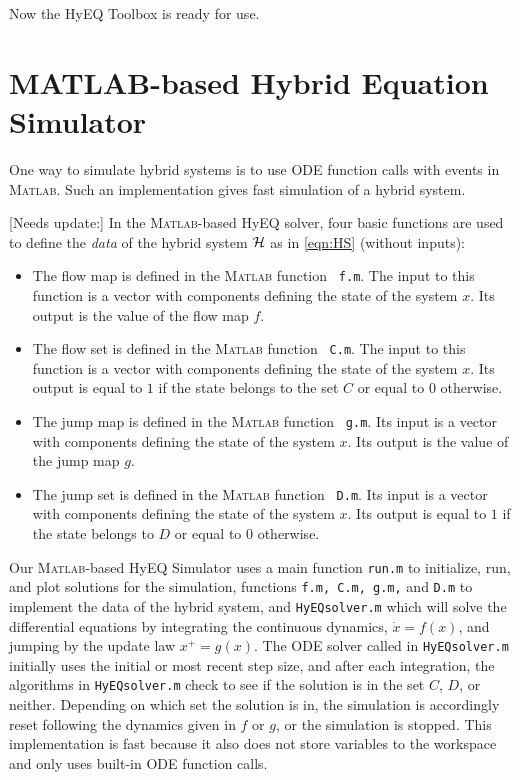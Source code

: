 \documentclass{article}
\newcommand{\matlab}{\textsc{Matlab}}
\newcommand{\needsupdate}[1]{{\color{red} [Needs update:] #1}}
\begin{document}
Now the HyEQ Toolbox is ready for use.

\section{MATLAB-based Hybrid Equation Simulator}
\label{sec:litesolver}
One way to simulate hybrid systems is to use 
ODE function calls with events in \matlab{}. 
Such an implementation gives fast simulation of a hybrid system.

\needsupdate{
In the \matlab{}-based HyEQ solver, four basic functions are 
used to define the {\em data} of the hybrid system $\mathcal{H}$
as in \eqref{eqn:HS} (without inputs):
\begin{itemize}
\item The flow map is defined in the \matlab{} function {\tt
f.m}. The input to this function is a vector with components 
defining the state of the system $x$. Its output is the value of the flow map $f$.
\item The flow set is defined in the \matlab{} function {\tt
C.m}. The input to this function is a vector with components 
defining the state of the system $x$. Its output is equal to $1$ 
if the state belongs to the set $C$ or equal to $0$ otherwise.
\item The jump map is defined in the \matlab{} function {\tt
g.m}. Its input is a vector with components defining the state of the system $x$. 
Its output is the value of the jump map $g$.
\item The jump set is defined in the \matlab{} function {\tt
D.m}. Its input is a vector with components defining the state of the system $x$. 
Its output is equal to $1$ if the state belongs to $D$ or equal to $0$ otherwise.
\end{itemize}
}

Our \matlab{}-based HyEQ Simulator uses a main function {\tt run.m} to initialize, run, 
and plot solutions for the simulation, functions {\tt f.m, C.m, g.m,} and {\tt D.m} 
to implement the data of the hybrid system, and {\tt HyEQsolver.m} 
which will solve the differential equations by integrating the continuous dynamics, 
$\dot{x}=f(x)$, and jumping by the update law $x^+ = g(x)$. 
The ODE solver called in {\tt HyEQsolver.m} initially uses the initial or most recent step size, 
and after each integration, the algorithms in {\tt HyEQsolver.m} check to see 
if the solution is in the set $C$, $D$, or neither. 
Depending on which set the solution is in, 
the simulation is accordingly reset following the dynamics given in $f$ or $g$, 
or the simulation is stopped. 
This implementation is fast because it also does not store variables to the workspace 
and only uses built-in ODE function calls.
\end{document}
